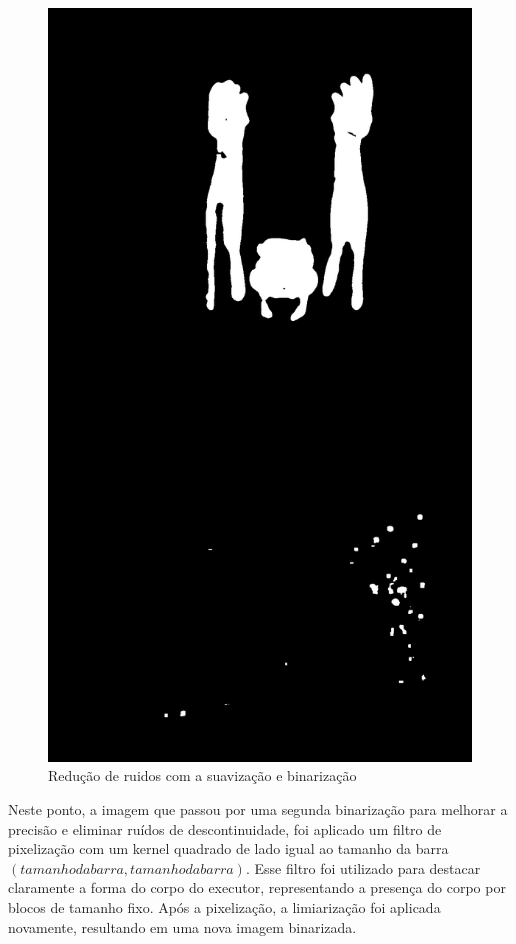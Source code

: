 \begin{figure}[!htbp]
\begin{minipage}{\sizeImg\textwidth}
            \includegraphics[width=\textwidth]{figuras/mao_barra/limited2.png}
        \end{minipage}
    \caption{Redução de ruidos com a suavização e binarização}
    \label{fig:blur}
\end{figure}
\newpage

Neste ponto, a imagem que passou por uma segunda binarização para melhorar a precisão e eliminar ruídos de descontinuidade, foi aplicado um filtro de pixelização com um kernel quadrado de lado igual ao tamanho da barra $(tamanho da barra, tamanho da barra)$. Esse filtro foi utilizado para destacar claramente a forma do corpo do executor, representando a presença do corpo por blocos de tamanho fixo. Após a pixelização, a limiarização foi aplicada novamente, resultando em uma nova imagem binarizada.

